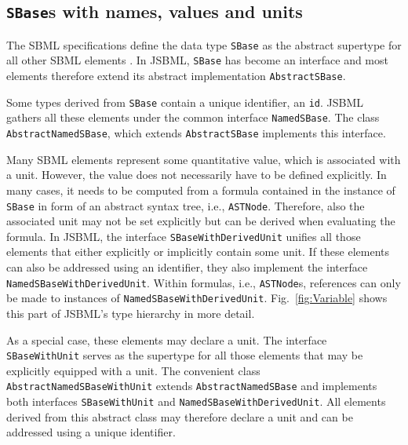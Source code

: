 \documentclass[
  BCOR12mm,
  letterpaper,
  11pt,
  headsepline,
  pointlessnumbers,
  tablecaptionabove,
  onelinecaption,
  headinclude,
  appendixprefix,
  idxtotoc,
  bibtotoc,
  twoside,
  titlepage
]{scrartcl}
\begin{document}
\subsection{\texttt{SBase}s with names, values and units}

The SBML
specifications define the data type \texttt{SBase}
as the abstract
supertype for all other SBML elements \citep{Hucka2003, Hucka2008, Hucka2010a}.
In JSBML, \texttt{SBase} has become an interface and most elements therefore
extend its abstract implementation \texttt{AbstractSBase}.

Some types derived from \texttt{SBase} contain a unique identifier, an
\texttt{id}. JSBML gathers all these elements under the common interface
\texttt{NamedSBase}. The class \texttt{AbstractNamedSBase}, which extends
\texttt{AbstractSBase} implements this interface.

Many SBML elements represent some quantitative value, which is associated with a
unit. However, the value does not necessarily have to be defined explicitly. In
many cases, it needs to be computed from a formula contained in the instance of
\texttt{SBase} in form of an abstract syntax tree, i.e., \texttt{ASTNode}.
Therefore, also the associated unit may not be set explicitly but can be derived
when evaluating the formula. In JSBML, the interface
\texttt{SBaseWithDerivedUnit}
unifies all those elements
that either explicitly or implicitly contain some unit. If these elements can
also be addressed using an identifier, they also implement the interface
\texttt{NamedSBaseWithDerivedUnit}.
Within formulas, i.e., \texttt{ASTNode}s,
references can only be made to instances of \texttt{NamedSBaseWithDerivedUnit}.
Fig.~\vref{fig:Variable} shows this part of JSBML's type hierarchy in more
detail.

As a special case, these elements may declare a unit. The interface
\texttt{SBaseWithUnit}
serves as the supertype for all those elements that may
be explicitly equipped with a unit. The convenient class
\texttt{AbstractNamedSBaseWithUnit}
extends \texttt{AbstractNamedSBase} and
implements both interfaces \texttt{SBaseWithUnit} and
\texttt{NamedSBaseWithDerivedUnit}.
All elements derived from this abstract
class may therefore declare a unit and can be addressed using a unique
identifier.
\end{document}
